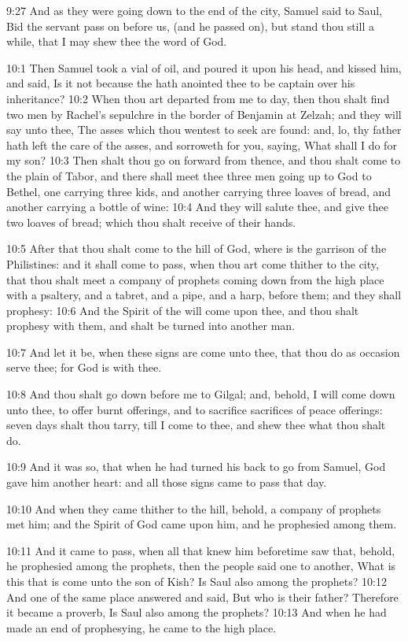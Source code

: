 9:27 And as they were going down to the end of the city, Samuel said to Saul, Bid the servant pass on before us, (and he passed on), but stand thou still a while, that I may shew thee the word of God.

10:1 Then Samuel took a vial of oil, and poured it upon his head, and kissed him, and said, Is it not because the \LORD hath anointed thee to be captain over his inheritance?  10:2 When thou art departed from me to day, then thou shalt find two men by Rachel's sepulchre in the border of Benjamin at Zelzah; and they will say unto thee, The asses which thou wentest to seek are found: and, lo, thy father hath left the care of the asses, and sorroweth for you, saying, What shall I do for my son?  10:3 Then shalt thou go on forward from thence, and thou shalt come to the plain of Tabor, and there shall meet thee three men going up to God to Bethel, one carrying three kids, and another carrying three loaves of bread, and another carrying a bottle of wine: 10:4 And they will salute thee, and give thee two loaves of bread; which thou shalt receive of their hands.

10:5 After that thou shalt come to the hill of God, where is the garrison of the Philistines: and it shall come to pass, when thou art come thither to the city, that thou shalt meet a company of prophets coming down from the high place with a psaltery, and a tabret, and a pipe, and a harp, before them; and they shall prophesy: 10:6 And the Spirit of the \LORD will come upon thee, and thou shalt prophesy with them, and shalt be turned into another man.

10:7 And let it be, when these signs are come unto thee, that thou do as occasion serve thee; for God is with thee.

10:8 And thou shalt go down before me to Gilgal; and, behold, I will come down unto thee, to offer burnt offerings, and to sacrifice sacrifices of peace offerings: seven days shalt thou tarry, till I come to thee, and shew thee what thou shalt do.

10:9 And it was so, that when he had turned his back to go from Samuel, God gave him another heart: and all those signs came to pass that day.

10:10 And when they came thither to the hill, behold, a company of prophets met him; and the Spirit of God came upon him, and he prophesied among them.

10:11 And it came to pass, when all that knew him beforetime saw that, behold, he prophesied among the prophets, then the people said one to another, What is this that is come unto the son of Kish? Is Saul also among the prophets?  10:12 And one of the same place answered and said, But who is their father? Therefore it became a proverb, Is Saul also among the prophets?  10:13 And when he had made an end of prophesying, he came to the high place.

